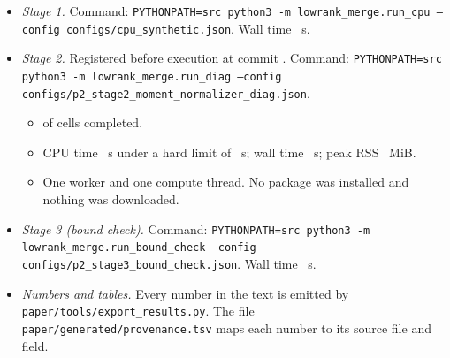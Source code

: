 \begin{itemize}
\item \emph{Stage 1.} Command:
\texttt{PYTHONPATH=src python3 -m lowrank\_merge.run\_cpu --config configs/cpu\_synthetic.json}.
Wall time \SOneWall~s.
\item \emph{Stage 2.} Registered before execution at commit \texttt{\STwoCommit}. Command:
\texttt{PYTHONPATH=src python3 -m lowrank\_merge.run\_diag --config
configs/p2\_stage2\_moment\_normalizer\_diag.json}.
\begin{itemize}
\item \STwoCellsOK{} of \STwoCellsTotal{} cells completed.
\item CPU time \STwoCPU~s under a hard limit of \STwoCPUCap~s; wall time \STwoWall~s; peak RSS
\STwoRSS~MiB.
\item One worker and one compute thread. No package was installed and nothing was downloaded.
\end{itemize}
\item \emph{Stage 3 (bound check).} Command:
\texttt{PYTHONPATH=src python3 -m lowrank\_merge.run\_bound\_check --config
configs/p2\_stage3\_bound\_check.json}. Wall time \SThreeWall~s.
\item \emph{Numbers and tables.} Every number in the text is emitted by
\texttt{paper/tools/export\_results.py}. The file \texttt{paper/generated/provenance.tsv} maps each
number to its source file and field.
\end{itemize}
